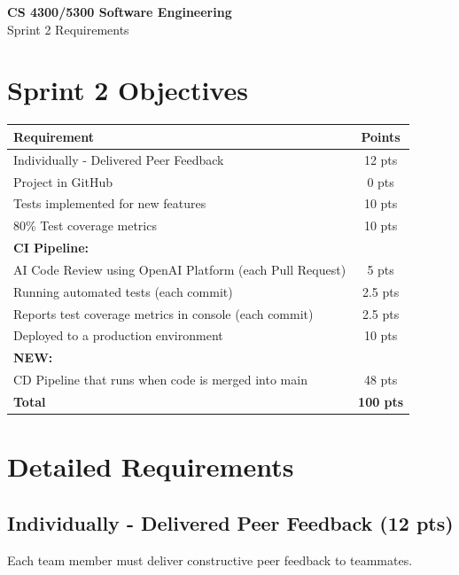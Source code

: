 \documentclass[11pt]{article}
\begin{document}
\begin{center}
{\LARGE\textbf{CS 4300/5300 Software Engineering}}\\[0.5em]
{\Large Sprint 2 Requirements}\\[1em]
\end{center}

\section{Sprint 2 Objectives}

\begin{center}
\begin{tabular}{lc}
\toprule
\textbf{Requirement} & \textbf{Points} \\
\midrule
Individually - Delivered Peer Feedback & 12 pts \\
Project in GitHub & 0 pts \\
Tests implemented for new features & 10 pts \\
80\% Test coverage metrics & 10 pts \\
\midrule
\multicolumn{2}{l}{\textbf{CI Pipeline:}} \\
\quad AI Code Review using OpenAI Platform (each Pull Request) & 5 pts \\
\quad Running automated tests (each commit) & 2.5 pts \\
\quad Reports test coverage metrics in console (each commit) & 2.5 pts \\
\midrule
Deployed to a production environment & 10 pts \\
\midrule
\multicolumn{2}{l}{\textcolor{newitem}{\textbf{NEW:}}} \\
CD Pipeline that runs when code is merged into main & 48 pts \\
\midrule
\textbf{Total} & \textbf{100 pts} \\
\bottomrule
\end{tabular}
\end{center}

\section{Detailed Requirements}


\subsection{Individually - Delivered Peer Feedback (12 pts)}
Each team member must deliver constructive peer feedback to teammates.
\end{document}

